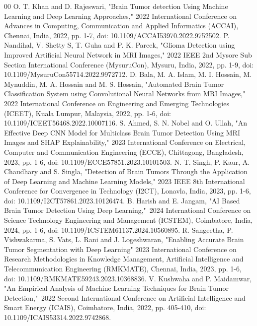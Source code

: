 \documentclass[conference]{IEEEtran}
\begin{document}
\begin{thebibliography}{00}
 O. T. Khan and D. Rajeswari, "Brain Tumor detection Using Machine Learning and Deep 
Learning Approaches," 2022 International Conference on Advances in Computing, Communication and Applied Informatics (ACCAI), Chennai, India, 2022, pp. 1-7, doi: 10.1109/ACCAI53970.2022.9752502.
 P. Nandihal, V. Shetty S, T. Guha and P. K. Pareek, "Glioma Detection using Improved Artificial Neural Network in MRI Images," 2022 IEEE 2nd Mysore Sub Section International Conference (MysuruCon), Mysuru, India, 2022, pp. 1-9, doi: 10.1109/MysuruCon55714.2022.9972712.
 D. Bala, M. A. Islam, M. I. Hossain, M. Mynuddin, M. A. Hossain and M. S. Hossain, "Automated Brain Tumor Classification System using Convolutional Neural Networks from MRI Images," 2022 International Conference on Engineering and Emerging Technologies (ICEET), Kuala Lumpur, Malaysia, 2022, pp. 1-6, doi: 10.1109/ICEET56468.2022.10007116.
S. Ahmed, S. N. Nobel and O. Ullah, "An Effective Deep CNN Model for Multiclass Brain Tumor Detection Using MRI Images and SHAP Explainability," 2023 International Conference on Electrical, Computer and Communication Engineering (ECCE), Chittagong, Bangladesh, 2023, pp. 1-6, doi: 10.1109/ECCE57851.2023.10101503.
N. T. Singh, P. Kaur, A. Chaudhary and S. Singla, "Detection of Brain Tumors Through the Application of Deep Learning and Machine Learning Models," 2023 IEEE 8th International Conference for Convergence in Technology (I2CT), Lonavla, India, 2023, pp. 1-6, doi: 10.1109/I2CT57861.2023.10126474.
B. Harish and E. Jangam, "AI Based Brain Tumor Detection Using Deep Learning," 2024 International Conference on Science Technology Engineering and Management (ICSTEM), Coimbatore, India, 2024, pp. 1-6, doi: 10.1109/ICSTEM61137.2024.10560895.
R. Sangeetha, P. Vishwakarma, S. Vats, L. Rani and J. Logeshwaran, "Enabling Accurate Brain Tumor Segmentation with Deep Learning" 2023 International Conference on Research Methodologies in Knowledge Management, Artificial Intelligence and Telecommunication Engineering (RMKMATE), Chennai, India, 2023, pp. 1-6, doi: 10.1109/RMKMATE59243.2023.10368836.
V. Kushwaha and P. Maidamwar, "An Empirical Analysis of Machine Learning Techniques for Brain Tumor Detection," 2022 Second International Conference on Artificial Intelligence and Smart Energy (ICAIS), Coimbatore, India, 2022, pp. 405-410, doi: 10.1109/ICAIS53314.2022.9742868.

\end{thebibliography}
\end{document}
